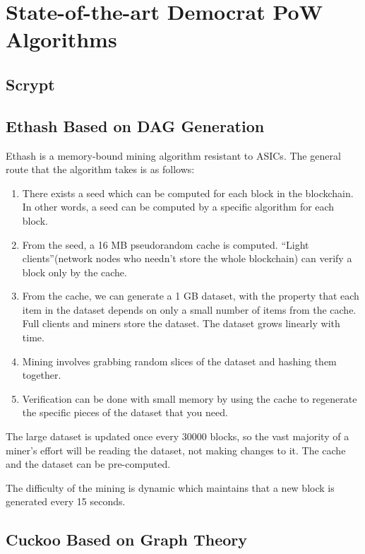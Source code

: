 \documentclass[11pt]{article}
\begin{document}
\section{State-of-the-art Democrat PoW Algorithms}

\subsection{Scrypt}



\subsection{Ethash Based on DAG Generation}

Ethash is a memory-bound mining algorithm resistant to ASICs\cite{ethash}. The general route that the algorithm takes is as follows:

\begin{enumerate}
\item There exists a seed which can be computed for each block in the blockchain. In other words, a seed can be computed by a specific algorithm for each block.
\item From the seed, a 16 MB pseudorandom cache is computed. ``Light clients''(network nodes who needn't store the whole blockchain) can verify a block only by the cache.
\item From the cache, we can generate a 1 GB dataset, with the property that each item in the dataset depends on only a small number of items from the cache. Full clients and miners store the dataset. The dataset grows linearly with time.
\item Mining involves grabbing random slices of the dataset and hashing them together. \item Verification can be done with small memory by using the cache to regenerate the specific pieces of the dataset that you need.
\end{enumerate}

The large dataset is updated once every 30000 blocks, so the vast majority of a miner's effort will be reading the dataset, not making changes to it. The cache and the dataset can be pre-computed.

The difficulty of the mining is dynamic which maintains that a new block is generated every 15 seconds.

\subsection{Cuckoo Based on Graph Theory}
\end{document}
